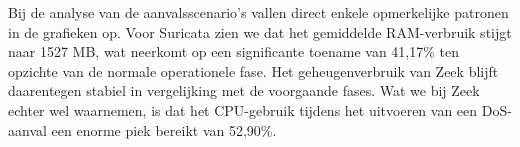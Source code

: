Bij de analyse van de aanvalsscenario's vallen direct enkele opmerkelijke patronen in de grafieken op. Voor Suricata zien we dat het gemiddelde RAM-verbruik stijgt naar 1527 MB, wat neerkomt op een significante toename van 41,17\% ten opzichte van de normale operationele fase. Het geheugenverbruik van Zeek blijft daarentegen stabiel in vergelijking met de voorgaande fases. Wat we bij Zeek echter wel waarnemen, is dat het CPU-gebruik tijdens het uitvoeren van een DoS-aanval een enorme piek bereikt van 52,90\%.